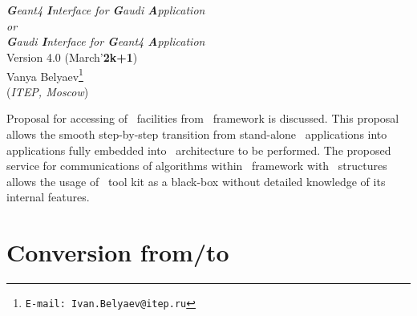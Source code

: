  
\begin{titlepage}
\vspace*{-23mm}
\mbox{}
\hfill
\mbox{}
\begin{center}
\mbox{}\\[20mm]
\mbox{}\\[0.7cm]
{\large \it {\bfseries\itshape{G}}eant4 {\bfseries\itshape{I}}nterface 
            for {\bfseries\itshape{G}}audi {\bfseries\itshape{A}}pplication}\\[0.0cm]
{\large \it or                                                             }\\[0.0cm]
{\large \it {\bfseries\itshape{G}}audi  {\bfseries\itshape{I}}nterface for 
            {\bfseries\itshape{G}}eant4 {\bfseries\itshape{A}}pplication}\\[1.0cm]
{\large Version 4.0 (March'{\bf{2k+1}})}\\[3cm]
{\large Vanya Belyaev\footnote{{\tt{E-mail: Ivan.Belyaev@itep.ru}}} 
\\ ({\it{ITEP, Moscow}}) }\\[1cm]
\end{center}
\vfill
\begin{center} { } \end{center}
\end{titlepage}

\abstract
{ 
Proposal for accessing of  \gfour\ facilities from 
\gaudi\ framework is discussed. 
This proposal allows the smooth step-by-step transition 
from  stand-alone \geantfour\ applications into 
applications fully embedded into 
\gaudi\ 
architecture to be performed. 
The proposed service for communications of 
algorithms within \gaudi\ framework 
with \gfour\ structures allows the usage of \gfour\ tool kit 
as a black-box without detailed knowledge of its internal 
features.
}


\newpage

\tableofcontents 
% 




\chapter{ Conversion from/to \gfour } 





%
%
%
%
%




